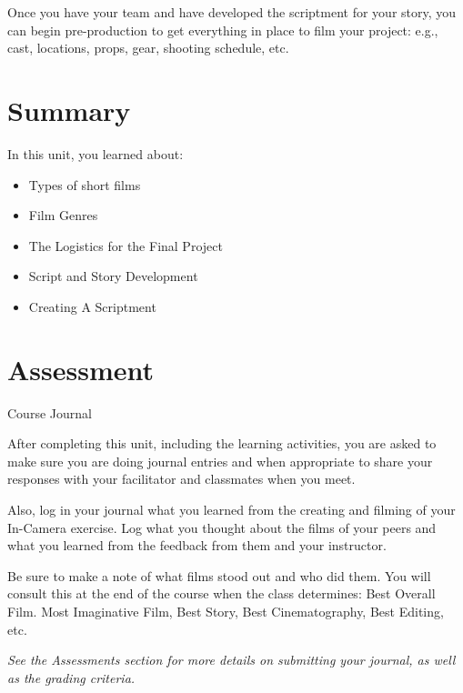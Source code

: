 \documentclass[
]{book}
\providecommand{\tightlist}{%
  \setlength{\itemsep}{0pt}\setlength{\parskip}{0pt}}
\begin{document}
\begin{reflect}
Once you have your team and have developed the scriptment for your story, you can begin pre-production to get everything in place to film your project: e.g., cast, locations, props, gear, shooting schedule, etc.
\end{reflect}

\hypertarget{summary-7}{%
\section*{Summary}\label{summary-7}}

In this unit, you learned about:

\begin{itemize}
\tightlist
\item
  Types of short films\\
\item
  Film Genres\\
\item
  The Logistics for the Final Project\\
\item
  Script and Story Development\\
\item
  Creating A Scriptment
\end{itemize}

\hypertarget{assessment-15}{%
\section*{Assessment}\label{assessment-15}}

\begin{assessment}
{Course Journal}

After completing this unit, including the learning activities, you are asked to make sure you are doing journal entries and when appropriate to share your responses with your facilitator and classmates when you meet.

Also, log in your journal what you learned from the creating and filming of your In-Camera exercise. Log what you thought about the films of your peers and what you learned from the feedback from them and your instructor.

Be sure to make a note of what films stood out and who did them. You will consult this at the end of the course when the class determines: Best Overall Film. Most Imaginative Film, Best Story, Best Cinematography, Best Editing, etc.

\emph{See the Assessments section for more details on submitting your journal, as well as the grading criteria.}
\end{assessment}
\end{document}
